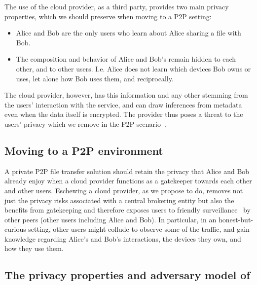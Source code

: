 The use of the cloud provider, as a third party,
provides two main privacy properties, which we should preserve when
moving to a P2P setting:
\begin{itemize}
\item Alice and Bob are the only users who learn 
about Alice sharing a file with Bob.
\item The composition and behavior of Alice and Bob's \squad remain
  hidden to each other, and to other users. I.e. Alice does not learn
  which devices Bob owns or uses, let alone how Bob uses them, and
  reciprocally.
\end{itemize} 
The cloud provider, however, has this information and any other
stemming from the users' interaction with the service, and can draw
inferences from metadata even when the data itself is encrypted. The
provider thus poses a threat to the users' privacy which we remove in
the P2P scenario~\cite{DevilInMetadata}.


\subsection{Moving to a P2P environment}
A private P2P file transfer solution should retain the privacy that
Alice and Bob already enjoy when a cloud provider functions as a
gatekeeper towards each other and other users.  Eschewing a cloud
provider, as we propose to do, removes not just the privacy risks
associated with a central brokering entity but also the benefits from
gatekeeping and therefore exposes users to friendly
surveillance~\cite{FriendlySurveillance} by other peers (other \name
users including Alice and Bob). In particular, in an
honest-but-curious setting, other users might collude to observe some
of the traffic, and gain knowledge regarding Alice's and Bob's
interactions, the devices they own, and how they use them.

\subsection{The privacy properties and adversary model of \name}

